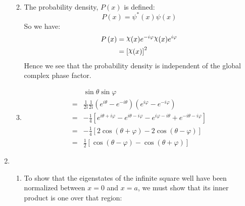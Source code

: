 \documentclass[10pt]{article}
\DeclareRobustCommand{\rchi}{{\mathpalette\irchi\relax}}
\newcommand{\irchi}[2]{\raisebox{\depth}{$#1\chi$}} %
\begin{document}
\begin{enumerate}
\begin{enumerate}
\begin{align*}
      \end{align*}
    \item 
      The probability density, $ P \left( x \right) $ is defined:
      \begin{equation*}
        P \left( x \right) = \psi ^* \left( x \right)\psi \left( x \right)
      \end{equation*}
      So we have:
      \begin{align*}
        P \left( x \right) &= \rchi (x) e ^ {-i \varphi } \rchi (x) e ^ {i \varphi } \\
                           &= \left[ \rchi (x)  \right] ^2
      \end{align*}
      Hence we see that the probability density is independent of the global complex phase factor.
    \item 
      \begin{align*}
        & \sin \theta \sin \varphi \\
        = & \frac{1}{2i}\frac{1}{2i}\left( e ^ {i\theta }-e ^ {-i\theta } \right) \left( e ^ {i\varphi }-e ^ {-i\varphi } \right) \\
        =& -\frac{1}{4} \left[ e ^ {i\theta +i\varphi } - e ^ {i\theta -i\varphi } - e ^ {i\varphi -i\theta } + e ^ {-i\theta -i\varphi } \right] \\
        =& -\frac{1}{4} \left[ 2\cos \left( \theta +\varphi  \right) - 2\cos \left( \theta -\varphi  \right) \right] \\
        =& \frac{1}{2} \left[ \cos \left( \theta -\varphi  \right) - \cos \left( \theta +\varphi  \right) \right]
      \end{align*}
    \end{enumerate}
  \item
  \begin{enumerate}
    
    \item 
    To show that the eigenstates of the infinite square well have been normalized between $ x=0 $ and $ x=a $, we must show that its inner product is one over that region:


\end{enumerate}
\end{enumerate}
\end{document}
